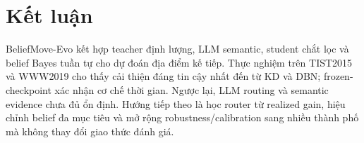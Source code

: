 \documentclass[runningheads]{llncs}
\newcommand{\method}{BeliefMove-Evo}
\begin{document}
\section{Kết luận}

\method{} kết hợp teacher định lượng, LLM semantic, student chắt lọc và belief Bayes tuần tự cho dự đoán địa điểm kế tiếp. Thực nghiệm trên TIST2015 và WWW2019 cho thấy cải thiện đáng tin cậy nhất đến từ KD và DBN; frozen-checkpoint xác nhận cơ chế thời gian. Ngược lại, LLM routing và semantic evidence chưa đủ ổn định. Hướng tiếp theo là học router từ realized gain, hiệu chỉnh belief đa mục tiêu và mở rộng robustness/calibration sang nhiều thành phố mà không thay đổi giao thức đánh giá.



\end{document}
